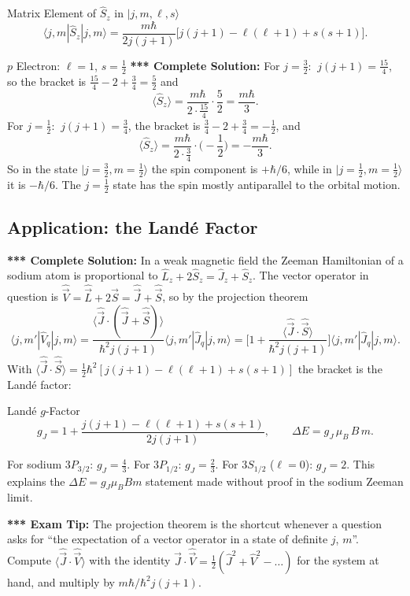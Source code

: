 \documentclass[11pt,a4paper]{article}
\begin{document}
\begin{thm}{Matrix Element of $\hat S_z$ in $|j,m,\ell,s\rangle$}
\[
\langle j,m|\hat S_z|j,m\rangle=\frac{m\hbar}{2j(j+1)}\Big[j(j+1)-\ell(\ell+1)+s(s+1)\Big].
\]
\end{thm}

\begin{prob}{$p$ Electron: $\ell=1$, $s=\tfrac12$}
\textbf{*** Complete Solution:} For $j=\tfrac32$: $\ j(j+1)=\tfrac{15}4$, so the bracket is $\tfrac{15}4-2+\tfrac34=\tfrac52$ and
\[
\langle\hat S_z\rangle=\frac{m\hbar}{2\cdot\frac{15}4}\cdot\frac52=\frac{m\hbar}3 .
\]
For $j=\tfrac12$: $\ j(j+1)=\tfrac34$, the bracket is $\tfrac34-2+\tfrac34=-\tfrac12$, and
\[
\langle\hat S_z\rangle=\frac{m\hbar}{2\cdot\frac34}\cdot\Big(-\frac12\Big)=-\frac{m\hbar}3 .
\]
So in the state $|j=\tfrac32,m=\tfrac12\rangle$ the spin component is $+\hbar/6$, while in $|j=\tfrac12,m=\tfrac12\rangle$ it is $-\hbar/6$. The $j=\tfrac12$ state has the spin mostly antiparallel to the orbital motion.
\end{prob}

\subsection{Application: the Land\'e Factor}
\textbf{*** Complete Solution:} In a weak magnetic field the Zeeman Hamiltonian of a sodium atom is proportional to $\hat L_z+2\hat S_z=\hat J_z+\hat S_z$. The vector operator in question is $\hat{\vec V}=\hat{\vec L}+2\hat{\vec S}=\hat{\vec J}+\hat{\vec S}$, so by the projection theorem
\[
\langle j,m'|\hat V_q|j,m\rangle=\frac{\langle\hat{\vec J}\cdot(\hat{\vec J}+\hat{\vec S})\rangle}{\hbar^2j(j+1)}\langle j,m'|\hat J_q|j,m\rangle=\Big[1+\frac{\langle\hat{\vec J}\cdot\hat{\vec S}\rangle}{\hbar^2j(j+1)}\Big]\langle j,m'|\hat J_q|j,m\rangle .
\]
With $\langle\hat{\vec J}\cdot\hat{\vec S}\rangle=\tfrac12\hbar^2[j(j+1)-\ell(\ell+1)+s(s+1)]$ the bracket is the Land\'e factor:
\begin{thm}{Land\'e $g$-Factor}
\[
g_J=1+\frac{j(j+1)-\ell(\ell+1)+s(s+1)}{2j(j+1)},\qquad \Delta E=g_J\,\mu_B\,B\,m .
\]
\end{thm}
For sodium $3P_{3/2}$: $g_J=\tfrac43$. For $3P_{1/2}$: $g_J=\tfrac23$. For $3S_{1/2}$ ($\ell=0$): $g_J=2$. This explains the $\Delta E=g_J\mu_BBm$ statement made without proof in the sodium Zeeman limit.

\textbf{*** Exam Tip:} The projection theorem is the shortcut whenever a question asks for ``the expectation of a vector operator in a state of definite $j$, $m$''. Compute $\langle\hat{\vec J}\cdot\hat{\vec V}\rangle$ with the identity $\hat{\vec J}\cdot\hat{\vec V}=\tfrac12(\hat J^2+\hat V^2-\ldots)$ for the system at hand, and multiply by $m\hbar/\hbar^2j(j+1)$.
\end{document}
